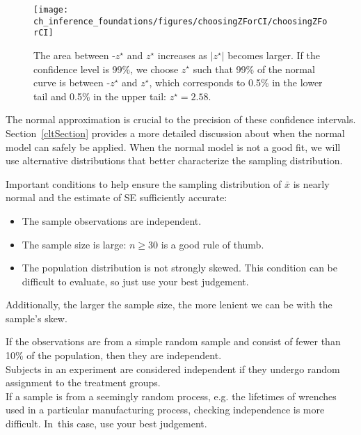\begin{figure}[h]
\centering
\texttt{[image: ch\_inference\_foundations/figures/choosingZForCI/choosingZForCI]}
\caption{The area between -$z^{\star}$ and $z^{\star}$ increases as $|z^{\star}|$ becomes larger. If the confidence level is 99\%, we choose $z^{\star}$ such that 99\% of the normal curve is between -$z^{\star}$ and $z^{\star}$, which corresponds to 0.5\% in the lower tail and 0.5\% in the upper tail: $z^{\star}=2.58$.}
\label{choosingZForCI}
\end{figure}

The normal approximation is crucial to the precision of these confidence intervals. Section~\ref{cltSection} provides a more detailed discussion about when the normal model can safely be applied. When the normal model is not a good fit, we will use alternative distributions that better characterize the sampling distribution.

\begin{termBox}{
Important conditions to help ensure the sampling distribution of $\bar{x}$ is nearly normal and the estimate of SE sufficiently accurate:
\begin{itemize}
\setlength{\itemsep}{0mm}
\item The sample observations are independent.
\item The sample size is large: $n\geq30$ is a good rule of thumb.
\item The population distribution is not strongly skewed. This condition can be difficult to evaluate, so just use your best judgement.
\end{itemize}
Additionally, the larger the sample size, the more lenient we can be with the sample's skew.}
\end{termBox}

\begin{tipBox}{
If the observations are from a simple random sample and consist of fewer than 10\% of the population, then they are independent.\\[2mm]
Subjects in an experiment are considered independent if they undergo random assignment to the treatment groups. \\[2mm]
If a sample is from a seemingly random process, e.g. the lifetimes of wrenches used in a particular manufacturing process, checking independence is more difficult. In~this case, use your best judgement.}
\end{tipBox}


